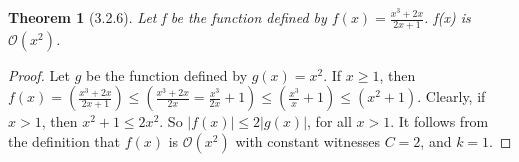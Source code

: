 \documentclass[a4paper, 12pt]{article}
\theoremstyle{plain}
\newtheorem*{theorem*}{Theorem}
\begin{document}
	
	\begin{theorem*}[3.2.6]
		Let f be the function defined by $f(x) = \frac{x^{3} + 2x}{2x + 1}$. \newline f(x) is $\mathcal{O}(x^{2})$.
	\end{theorem*}
	
	\begin{proof}
		Let $g$ be the function defined by $g(x) = x^{2}$. If $x \ge 1$, then \newline \newline \indent $f(x) = \left(\frac{x^{3} + 2x}{2x + 1}\right) \le \left(\frac{x^{3} + 2x}{2x} = \frac{x^{3}}{2x} + 1 \right) \le \left(\frac{x^{3}}{x} + 1 \right) \le \left( x^{2} + 1 \right)$.
		\newline
		\newline
		Clearly, if $x > 1$, then $x^{2} + 1 \le 2x^{2}$. So $|f(x)| \le 2|g(x)|$, for all $x > 1$. It follows from the definition that $f(x)$ is $\mathcal{O}(x^{2})$ with constant witnesses $C = 2$, and $k = 1$.
	\end{proof}
\end{document}
